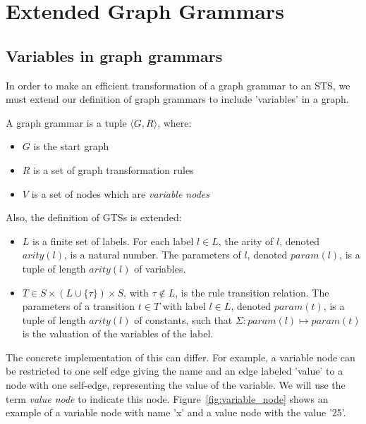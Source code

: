 \section{Extended Graph Grammars}\label{sec:extended_graph}

\subsection{Variables in graph grammars}
In order to make an efficient transformation of a graph grammar to an STS, we must extend our definition of graph grammars to include 'variables' in a graph.
\\
\begin{definition}
A graph grammar is a tuple $\langle G, R\rangle$, where:
\begin{itemize}
  \item $G$ is the start graph
  \item $R$ is a set of graph transformation rules
  \item $V$ is a set of nodes which are \textit{variable nodes}
\end{itemize}
\end{definition}

Also, the definition of GTSs is extended:
\\
\begin{definition}
\begin{itemize}
\item $L$ is a finite set of labels. For each label $l\in L$, the arity of $l$, denoted $\mathit{arity(l)}$, is a natural number. The parameters of $l$, denoted $\mathit{param(l)}$, is a tuple of length $\mathit{arity(l)}$ of variables.
\item $T \in S \times (L \cup \{\tau\}) \times S$, with $\tau \notin L$, is the rule transition relation. The parameters of a transition $t \in T$ with label $l \in L$, denoted $\mathit{param(t)}$, is a tuple of length $\mathit{arity(l)}$ of constants, such that $\Sigma:\mathit{param(l)} \mapsto \mathit{param(t)}$ is the valuation of the variables of the label.
\end{itemize}
\end{definition}

The concrete implementation of this can differ. For example, a variable node can be restricted to one self edge giving the name and an edge labeled 'value' to a node with one self-edge, representing the value of the variable. We will use the term \textit{value node} to indicate this node. Figure~\ref{fig:variable_node} shows an example of a variable node with name 'x' and a value node with the value '25'.

